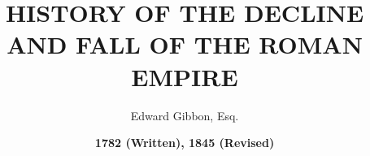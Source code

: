 \pretitle{\begin{center}\Huge\bfseries}
\title{HISTORY OF THE DECLINE AND FALL OF THE ROMAN EMPIRE}
\posttitle{\end{center}}
\preauthor{\begin{center}\large\bfseries}
\author{Edward Gibbon, Esq.}
\date{\bfseries\normalsize 1782 (Written), 1845 (Revised)}

\maketitle
